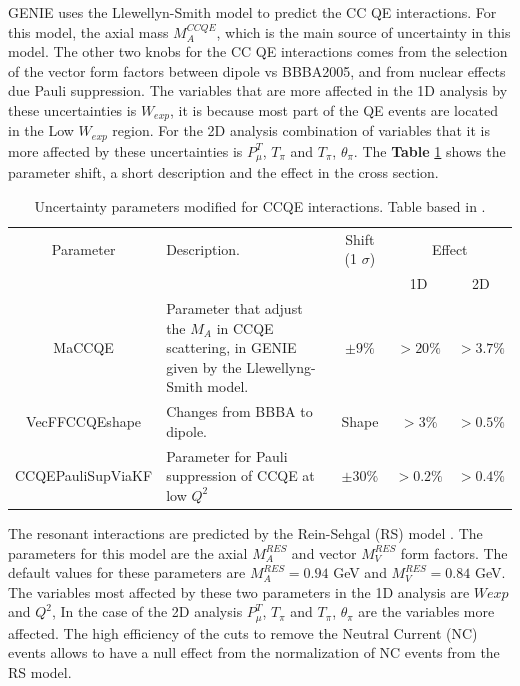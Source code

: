 GENIE uses the Llewellyn-Smith model to predict the CC QE interactions. For this model, the axial mass $M^{CCQE}_A$, which is the main source of uncertainty in this model. The other two knobs for the CC QE interactions comes from the selection of the vector form factors between dipole vs BBBA2005, and from nuclear effects due Pauli suppression. The variables that are more affected in the 1D analysis by these uncertainties is $W_{exp}$, it is because most part of the QE events are located in the Low $W_{exp}$ region. For the 2D analysis combination of variables that it is more affected by these uncertainties is $P^T_\mu$, $T_\pi$ and $T_\pi$, $\theta_\pi$. The \textbf{Table} \ref{tab:ErrorAnalysis:SystematicUnc:GenieCCQEmodels} shows the parameter shift, a short description and the effect in the cross section. 
 
\begin{table}[!htb]
    \centering
    \begin{tabular}{c|p{1.5in}|c|c|c}
        \hline 
        Parameter & Description.  & Shift (1 $\sigma$) & \multicolumn{2}{c}{Effect} \\
         & & & 1D & 2D \\
        \hline  
        MaCCQE & Parameter that adjust the $M_A$ in CCQE scattering, in GENIE given by the Llewellyng-Smith model. & $\pm9\%$ & $>20\%$ & $>3.7\%$ \\ \hline
        VecFFCCQEshape & Changes from BBBA to dipole. & Shape & $>3\%$ & $>0.5\%$ \\
        \hline
        CCQEPauliSupViaKF & Parameter for Pauli suppression of CCQE at low $Q^2$ &$\pm30\%$ & $>0.2\%$ & $>0.4\%$ \\ \hline
        
    \end{tabular}
    \caption{Uncertainty parameters modified for CCQE interactions. Table based in \cite{GENIEUnc}.}
    \label{tab:ErrorAnalysis:SystematicUnc:GenieCCQEmodels}
\end{table}

The resonant interactions are predicted by the Rein-Sehgal (RS) model \cite{REIN198179}. The parameters for this model are the axial $M^{RES}_A$ and vector $M^{RES}_V$ form factors. The default values for these parameters are $M^{RES}_A=0.94$ GeV and $M^{RES}_V =0.84$ GeV. The variables most affected by these two parameters in the 1D analysis are $W{exp}$ and $Q^2$, In the case of the 2D analysis $P^T_\mu$, $T_\pi$ and $T_\pi$, $\theta_\pi$ are the variables more affected. The high efficiency of the cuts to remove the Neutral Current (NC) events allows to have a null effect from the normalization of NC events from the RS model.

